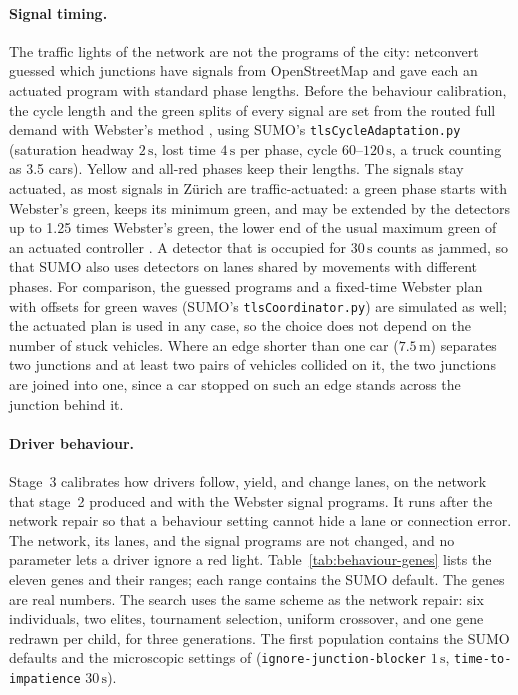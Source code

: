 \paragraph{Signal timing.} The traffic lights of the network are not
the programs of the city: netconvert guessed which junctions have
signals from OpenStreetMap and gave each an actuated program with
standard phase lengths. Before the behaviour calibration, the cycle
length and the green splits of every signal are set from the routed
full demand with Webster's method \citep{webster1958}, using SUMO's
\texttt{tlsCycleAdaptation.py} (saturation headway \(2\,\mathrm{s}\),
lost time \(4\,\mathrm{s}\) per phase, cycle
\(60\)--\(120\,\mathrm{s}\), a truck counting as 3.5 cars). Yellow
and all-red phases keep their lengths. The signals stay actuated, as
most signals in Zürich are traffic-actuated: a green phase starts with
Webster's green, keeps its minimum green, and may be extended by the
detectors up to 1.25 times Webster's green, the lower end of the usual
maximum green of an actuated controller \citep{koonce2008}. A detector
that is occupied for \(30\,\mathrm{s}\) counts as jammed, so that
SUMO also uses detectors on lanes shared by movements with different
phases. For comparison, the guessed programs and a fixed-time Webster
plan with offsets for green waves (SUMO's \texttt{tlsCoordinator.py})
are simulated as well; the actuated plan is used in any case, so the
choice does not depend on the number of stuck vehicles. Where an edge
shorter than one car (\(7.5\,\mathrm{m}\)) separates two junctions and
at least two pairs of vehicles collided on it, the two junctions are
joined into one, since a car stopped on such an edge stands across the
junction behind it.

\paragraph{Driver behaviour.} Stage~3 calibrates how drivers follow,
yield, and change lanes, on the network that stage~2 produced and with
the Webster signal programs. It runs after the network repair so that
a behaviour setting cannot hide a lane or connection error. The
network, its lanes, and the signal programs are not changed, and no
parameter lets a driver ignore a red light.
Table~\ref{tab:behaviour-genes} lists the eleven genes and their
ranges; each range contains the SUMO default. The genes are real
numbers. The search uses the same scheme as the network repair: six
individuals, two elites, tournament selection, uniform crossover, and
one gene redrawn per child, for three generations. The first population
contains the SUMO defaults and the microscopic settings of
\citet{baggenstos2026} (\texttt{ignore-junction-blocker}
\(1\,\mathrm{s}\), \texttt{time-to-impatience} \(30\,\mathrm{s}\)).

